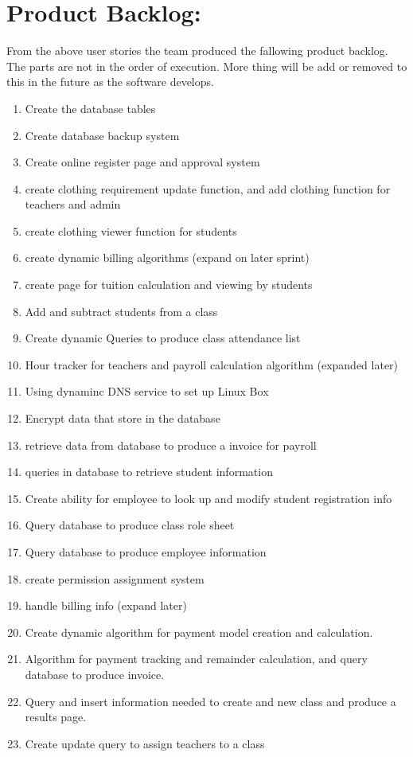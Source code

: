 \documentclass[11pt]{book}
\begin{document}
\section{Product Backlog:}

From the above user stories the team produced the fallowing product backlog. The parts are not in the order of execution. More thing will be add or removed to this in the future as the software develops.

\begin{enumerate}
\item Create the database tables
\item Create database backup system
\item Create online register page and approval system
\item create clothing requirement update function, and add clothing function for teachers and admin
\item create clothing viewer function for students
\item create dynamic billing algorithms (expand on later sprint)
\item create page for tuition calculation and viewing by students
\item Add and subtract students from a class
\item Create dynamic Queries to produce class attendance list
\item Hour tracker for teachers and payroll calculation algorithm (expanded later)
\item Using dynaminc DNS service to set up Linux Box
\item Encrypt data that store in the database
\item retrieve data from database to produce a invoice for payroll
\item queries in database to retrieve student information
\item Create ability for employee to look up and modify student registration info
\item Query database to produce class role sheet
\item Query database to produce employee information
\item create permission assignment system
\item handle billing info (expand later)
\item Create dynamic algorithm for payment model creation and calculation. 
\item Algorithm for payment tracking and remainder calculation, and query database to produce invoice.
\item Query and insert information needed to create and new class and produce a results page.
\item Create update query to assign teachers to a class
\end{enumerate}
\end{document}
